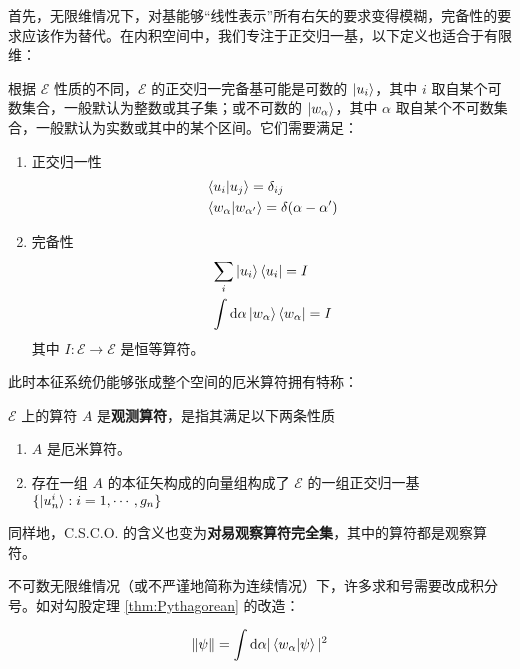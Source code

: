 \documentclass[cn,10pt,math=newtx,citestyle=gb7714-2015,bibstyle=gb7714-2015]{elegantbook}
\def\bf{\textbf}
\def\ms{\mathscr}
\def\d{\mathrm d}
\def\ra{\rightarrow}
\begin{document}
首先，无限维情况下，对基能够“线性表示”所有右矢的要求变得模糊，完备性的要求应该作为替代。在内积空间中，我们专注于正交归一基，以下定义也适合于有限维：
\begin{definition}[正交归一完备基]\label{def:orthonormalcomplete}
根据 $\ms E$ 性质的不同，$\ms E$ 的正交归一完备基可能是可数的 $\ket{u_i}$，其中 $i$ 取自某个可数集合，一般默认为整数或其子集；或不可数的 $\ket{w_\alpha}$，其中 $\alpha$ 取自某个不可数集合，一般默认为实数或其中的某个区间。它们需要满足：
\begin{enumerate}
   \item 正交归一性
   \begin{align}
      \label{eq:orthonormaldis}
      &\braket{u_i|u_j}=\delta_{ij}\\
      \label{eq:orthonormalcon}
      &\braket{w_\alpha|w_{\alpha'}}=\delta(\alpha-\alpha')
   \end{align}
   \item 完备性
   \begin{align}
      \label{eq:completedis}
      &\sum_i\ket{u_i}\bra{u_i}=I\\
      \label{eq:completecon}
      &\int\d\alpha\ket{w_\alpha}\bra{w_\alpha}=I
   \end{align}
   其中 $I:\ms E\ra\ms E$ 是恒等算符。
\end{enumerate}
\end{definition}

此时本征系统仍能够张成整个空间的厄米算符拥有特称：

\begin{definition}[观测算符]\label{def:observable}
   $\ms E$ 上的算符 $A$ 是\bf{观测算符}，是指其满足以下两条性质
   \begin{enumerate}
      \item $A$ 是厄米算符。

      \item 存在一组 $A$ 的本征矢构成的向量组构成了 $\ms E$ 的一组正交归一基 $\{\ket{u_n^i}:i=1,\cdots,g_n\}$
      
   \end{enumerate}
\end{definition}

同样地，C.S.C.O. 的含义也变为\textbf{对易观察算符完全集}，其中的算符都是观察算符。

不可数无限维情况（或不严谨地简称为连续情况）下，许多求和号需要改成积分号。如对勾股定理 \ref{thm:Pythagorean} 的改造：

\begin{equation*}
   \|\psi\|=\int\d\alpha |\braket{w_\alpha|\psi}|^2 
\end{equation*}
\end{document}
